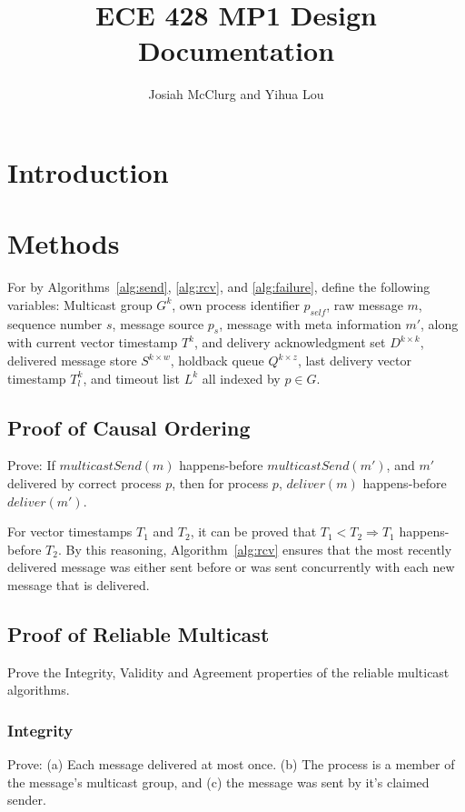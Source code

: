 \documentclass[]{article}
\title{ECE 428 MP1 Design Documentation}
\author{Josiah McClurg and Yihua Lou}
\begin{document}
\maketitle

\begin{abstract}

\end{abstract}

\section{Introduction}
\section{Methods}
For by Algorithms~\ref{alg:send}, \ref{alg:rcv}, and \ref{alg:failure}, define the following variables: Multicast group $G^k$, own process identifier $p_{self}$, raw message $m$, sequence number $s$, message source $p_s$, message with meta information $m'$, along with current vector timestamp $T^k$, and delivery acknowledgment set $D^{k\times k}$, delivered message store $S^{k\times w}$, holdback queue $Q^{k \times z}$, last delivery vector timestamp $T_l^k$, and timeout list $L^k$ all indexed by $p \in G$.
 
\subsection{Proof of Causal Ordering}
Prove: If $multicastSend(m)$ happens-before $multicastSend(m')$, and $m'$ delivered by correct process $p$, then for process $p$, $deliver(m)$ happens-before $deliver(m')$.

For vector timestamps $T_1$ and $T_2$, it can be proved that $T_1 < T_2 \Rightarrow T_1$ happens-before $T_2$. By this reasoning, Algorithm~\ref{alg:rcv} ensures that the most recently delivered message was either sent before or was sent concurrently with each new message that is delivered.

\subsection{Proof of Reliable Multicast}
Prove the Integrity, Validity and Agreement properties of the reliable multicast algorithms.

\subsubsection{Integrity}
Prove: (a) Each message delivered at most once. (b) The process is a member of the message's multicast group, and (c) the message was sent by it's claimed sender.
\end{document}
